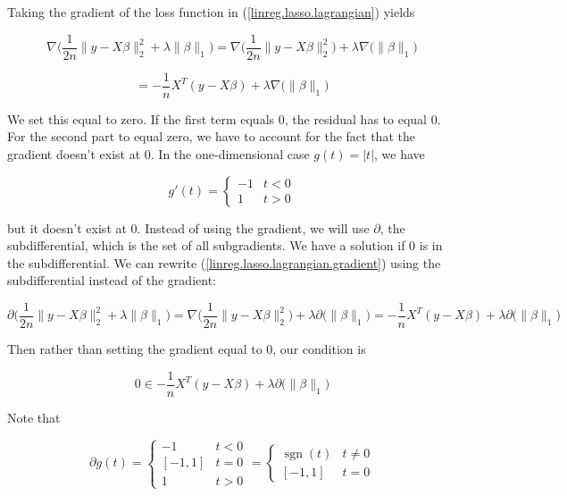 Taking the gradient of the loss function in (\ref{linreg.lasso.lagrangian}) yields

\[
\nabla \bigg(  \frac{1}{2n}\lVert y - X \beta \rVert_2^2   + \lambda \lVert \beta \rVert_1 \bigg) = \nabla   \bigg( \frac{1}{2n}\lVert y - X \beta \rVert_2^2   \bigg) + \lambda \nabla \big( \lVert \beta \rVert_1 \big)
\]

\begin{equation}\label{linreg.lasso.lagrangian.gradient}
= - \frac{1}{n} X^T(y - X \beta) + \lambda \nabla  \big( \lVert \beta \rVert_1 \big)
\end{equation}

We set this equal to zero. If the first term equals 0, the residual has to equal 0. For the second part to equal zero, we have to account for the fact that the gradient doesn't exist at 0. In the one-dimensional case \(g(t) = |t|\), we have

\[
g'(t) = \begin{cases}
-1 & t < 0 \\
1 & t > 0
\end{cases}
\]

but it doesn't exist at 0. Instead of using the gradient, we will use \(\partial\), the subdifferential, which is the set of all subgradients. We have a solution if 0 is in the subdifferential. We can rewrite (\ref{linreg.lasso.lagrangian.gradient}) using the subdifferential instead of the gradient:

\[
\partial \bigg(  \frac{1}{2n}\lVert y - X \beta \rVert_2^2   + \lambda \lVert \beta \rVert_1 \bigg) = \nabla \bigg(  \frac{1}{2n}\lVert y - X \beta \rVert_2^2  \bigg)  + \lambda \partial \big( \lVert \beta \rVert_1 \big)  =  - \frac{1}{n} X^T(y - X \beta) + \lambda \partial \big( \lVert \beta \rVert_1 \big)
\]

Then rather than setting the gradient equal to 0, our condition is

\[
0 \in - \frac{1}{n} X^T(y - X \beta) + \lambda \partial \big( \lVert \beta \rVert_1 \big)
\]

Note that 

\[
\partial g (t) = \begin{cases}
-1 & t < 0 \\
[-1, 1] & t = 0 \\
1 & t > 0
\end{cases} = \begin{cases}
\operatorname{sgn}(t) & t \neq 0 \\
[-1, 1] & t = 0 
\end{cases}
\]

